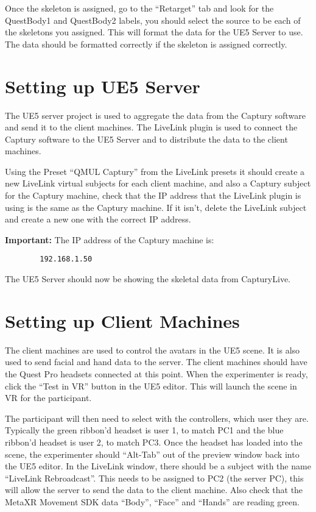 Once the skeleton is assigned, go to the ``Retarget'' tab and look for the QuestBody1 and QuestBody2 labels, you should select the source to be each of the skeletons you assigned. This will format the data for the UE5 Server to use. The data should be formatted correctly if the skeleton is assigned correctly.

\section{Setting up UE5 Server}
The UE5 server project is used to aggregate the data from the Captury software and send it to the client machines. The LiveLink plugin is used to connect the Captury software to the UE5 Server and to distribute the data to the client machines.

Using the Preset ``QMUL Captury'' from the LiveLink presets it should create a new LiveLink virtual subjects for each client machine, and also a Captury subject for the Captury machine, check that the IP address that the LiveLink plugin is using is the same as the Captury machine. If it isn't, delete the LiveLink subject and create a new one with the correct IP address.

\begin{tcolorbox}
    \textbf{Important: } The IP address of the Captury machine is: 
    \begin{verbatim}
        192.168.1.50
    \end{verbatim}
\end{tcolorbox}

The UE5 Server should now be showing the skeletal data from CapturyLive.

\section{Setting up Client Machines}
The client machines are used to control the avatars in the UE5 scene. It is also used to send facial and hand data to the server. The client machines should have the Quest Pro headsets connected at this point. When the experimenter is ready, click the ``Test in VR'' button in the UE5 editor. This will launch the scene in VR for the participant.

The participant will then need to select with the controllers, which user they are. Typically the green ribbon'd headset is user 1, to match PC1 and the blue ribbon'd headset is user 2, to match PC3. Once the headset has loaded into the scene, the experimenter should ``Alt-Tab'' out of the preview window back into the UE5 editor. In the LiveLink window, there should be a subject with the name ``LiveLink Rebroadcast''. This needs to be assigned to PC2 (the server PC), this will allow the server to send the data to the client machine. Also check that the MetaXR Movement SDK data ``Body'', ``Face'' and ``Hands'' are reading green.

